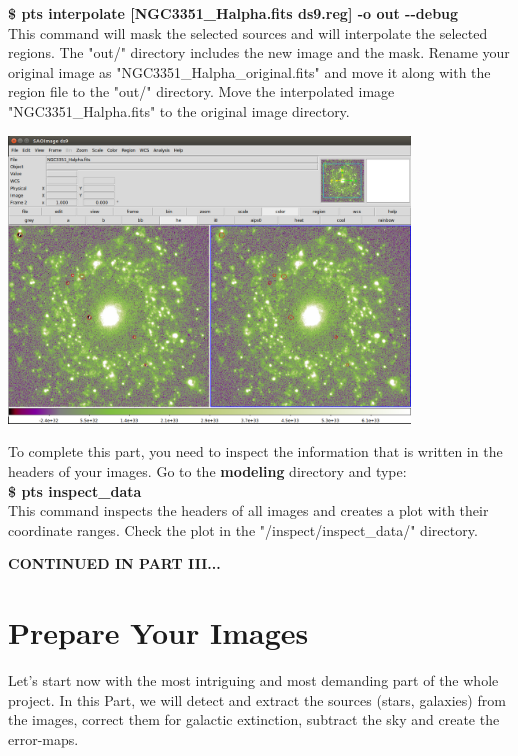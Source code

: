 \documentclass[15pt,a4paper,oneside,openright]{report}
\begin{document}
\textbf{\$ pts interpolate [NGC3351\_Halpha.fits ds9.reg] -o out -{}-debug}\\

This command will mask the selected sources and will interpolate the selected regions. The "out/" directory includes the new image and the mask. 
Rename your original image as "NGC3351\_Halpha\_original.fits" and move it along with the region file to the "out/" directory. Move the 
interpolated image "NGC3351\_Halpha.fits" to the original image directory.

\begin{center}
\includegraphics[width=0.8\textwidth]{figures/pts_interpolate_halpha.png} 
\end{center}

To complete this part, you need to inspect the information that is written in the headers of your images. Go to the \textbf{modeling} directory
and type:\\

\textbf{\$ pts inspect\_data}\\

This command inspects the headers of all images and creates a plot with their coordinate ranges.
Check the plot in the "/inspect/inspect\_data/" directory.\\

\begin{center}
\textbf{CONTINUED IN PART III...}
\end{center}

\part{Prepare Your Images}

Let's start now with the most intriguing and most demanding part of the whole project. In this Part, we will detect and extract the sources (stars, galaxies) from the images, correct them for galactic extinction, subtract the sky and create the error-maps.\\
\end{document}

